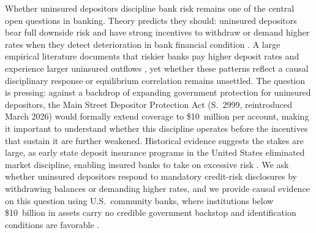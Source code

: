 Whether uninsured depositors discipline bank risk remains one of the central open
questions in banking.  Theory predicts they should: uninsured depositors bear
full downside risk and have strong incentives to withdraw or demand higher rates
when they detect deterioration in bank financial condition
\citep{calomiris1991role, diamond2001liquidity}.  A large empirical literature
documents that riskier banks pay higher deposit rates and experience larger
uninsured outflows \citep{park1995market, martinez2001depositors,
maechler2006dynamic, iyer2016tale, egan2017deposit, chen2024liquidity}, yet whether these patterns
reflect a causal disciplinary response or equilibrium correlation remains
unsettled.  The question is pressing: against a backdrop of expanding government
protection for uninsured depositors, the Main Street Depositor Protection Act
(S.~2999, reintroduced March 2026) would formally extend coverage to
\$10~million per account, making it important to understand whether this
discipline operates before the incentives that sustain it are further weakened. Historical
evidence suggests the stakes are large, as early state deposit insurance programs in the
United States eliminated market discipline, enabling insured banks to take on excessive
risk \citep{calomiris2019stealing}.
We ask whether uninsured depositors respond to mandatory credit-risk disclosures
by withdrawing balances or demanding higher rates, and we provide causal evidence
on this question using U.S.\ community banks, where institutions below
\$10~billion in assets carry no credible government backstop and identification
conditions are favorable \citep{o1990deposit, flannery1996evidence}.

